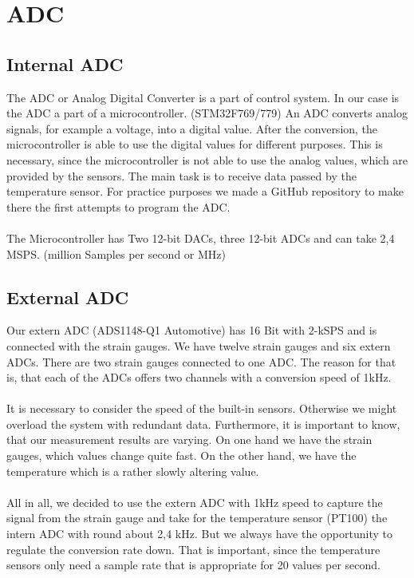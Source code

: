 \section{ADC}
\subsection{Internal ADC}
The ADC or Analog Digital Converter is a part of control system. In our case is the ADC a part of a microcontroller. (STM32F769/779) An ADC converts analog signals, for example a voltage, into a digital value. After the conversion, the microcontroller is able to use the digital values for different purposes. This is necessary, since the microcontroller is not able to use the analog values, which are provided by the sensors. The main task is to receive data passed by the temperature sensor. For practice purposes we made a GitHub repository to make there the first attempts to program the ADC. \\ \\
The Microcontroller has Two 12-bit DACs, three 12-bit ADCs and can take 2,4 MSPS. (million Samples per second or MHz) 
\subsection{External ADC}
Our extern ADC (ADS1148-Q1 Automotive) has 16 Bit with 2-kSPS and is connected with the strain gauges. We have twelve strain gauges and six extern ADCs. There are two strain gauges connected to one ADC. The reason for that is, that each of the ADCs offers two channels with a conversion speed of 1kHz. \\ \\
It is necessary to consider the speed of the built-in sensors. Otherwise we might overload the system with redundant data. Furthermore, it is important to know, that our measurement results are varying. On one hand we have the strain gauges, which values change quite fast. On the other hand, we have the temperature which is a rather slowly altering value. \\ \\
All in all, we decided to use the extern ADC with 1kHz speed to capture the signal from the strain gauge and take for the temperature sensor (PT100) the intern
ADC with round about 2,4 kHz. But we always have the opportunity to regulate
the conversion rate down. That is important, since the temperature sensors only need
a sample rate that is appropriate for 20 values per second.
